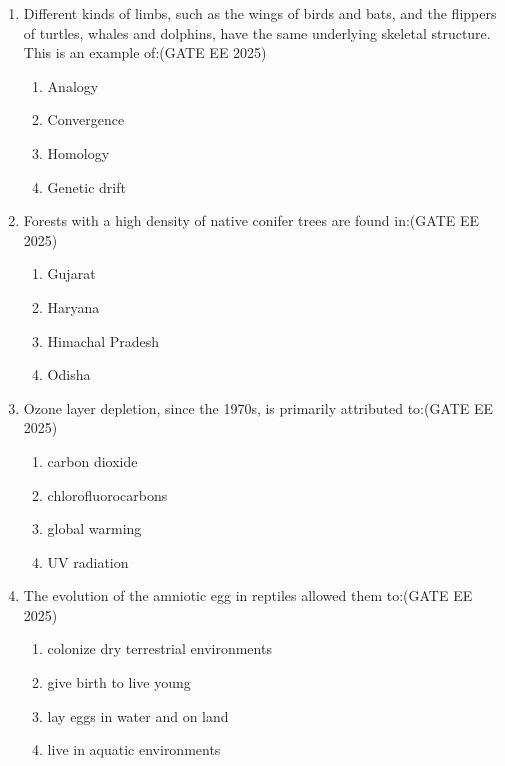 \begin{enumerate}[leftmargin=*,label=\textbf{Q.\arabic*}]

\item Different kinds of limbs, such as the wings of birds and bats, and the flippers of turtles, whales and dolphins, have the same underlying skeletal structure. This is an example of:\hfill {(GATE EE 2025)}
\begin{multicols}{2}
\begin{enumerate}
\item Analogy
\item Convergence
\item Homology
\item Genetic drift
\end{enumerate}
\end{multicols}

\item Forests with a high density of native conifer trees are found in:\hfill {(GATE EE 2025)}
\begin{multicols}{2}
\begin{enumerate}
\item Gujarat
\item Haryana
\item Himachal Pradesh
\item Odisha
\end{enumerate}
\end{multicols}

\item Ozone layer depletion, since the 1970s, is primarily attributed to:\hfill {(GATE EE 2025)}
\begin{multicols}{2}
\begin{enumerate}
\item carbon dioxide
\item chlorofluorocarbons
\item global warming
\item UV radiation
\end{enumerate}
\end{multicols}

\item The evolution of the amniotic egg in reptiles allowed them to:\hfill {(GATE EE 2025)}
\begin{multicols}{2}
\begin{enumerate}
\item colonize dry terrestrial environments
\item give birth to live young
\item lay eggs in water and on land
\item live in aquatic environments
\end{enumerate}
\end{multicols}


\end{enumerate}
